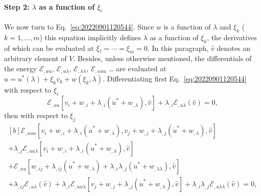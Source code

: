 \documentclass[12pt, final]{scrartcl}
\theoremstyle{definition}
\newcommand{\E}{\mathcal E}
\begin{document}
\paragraph{Step 2: $\lambda$ as a function of $ξ_i$} We now turn to
Eq.~\eqref{eq:20220901120544}. Since $w$ is a function of $\lambda$ and $ξ_k$
($k = 1, \ldots, m$) this equation implicitly defines $\lambda$ as a function of
$ξ_k$, the derivatives of which can be evaluated at $ξ₁ = \cdots = ξ_m =
0$. In this paragraph, $\hat{v}$ denotes an arbitrary element of
$V$. Besides, unless otherwise mentioned, the differentials of the energy
$\E_{,uu}$, $\E_{,u\lambda}$, $\E_{,\lambda\lambda}$, $\E_{,uuu}$ \dots{} are evaluated at
$u = u^\ast(\lambda) + ξ_k v_k + w(ξ_k, \lambda)$. Differentiating first
Eq.~\eqref{eq:20220901120544} with respect to $ξ_i$
\begin{equation}
  \label{eq:20220901121940}
  \E_{,uu}[v_i + w_{,i} + \lambda_{,i} (\dot{u}^\ast + w_{,\lambda}), \hat{v}] + \lambda_{, i} \E_{,u\lambda}(\hat{v}) = 0,
\end{equation}
then with respect to $ξ_j$
\begin{equation}
  \label{eq:20220901125230}
  \begin{gathered}[b]
    \E_{,uuu}[v_i + w_{,i} + \lambda_{,i} (\dot{u}^\ast + w_{,\lambda}), v_j + w_{,j} + \lambda_{,j} (\dot{u}^\ast + w_{,\lambda}), \hat{v}]\\
    + \lambda_{,j}\E_{,uu\lambda}[v_i + w_{,i} + \lambda_{,i} (\dot{u}^\ast + w_{,\lambda}), \hat{v}]\\
    + \E_{,uu}[w_{,ij} + \lambda_{,ij} (\dot{u}^\ast + w_{,\lambda}) + \lambda_{,i}\lambda_{,j} (\ddot{u}^\ast + w_{,\lambda\lambda}), \hat{v}]\\
    + \lambda_{, ij} \E_{,u\lambda}(\hat{v}) + \lambda_{, i} \E_{,uu\lambda}[v_j + w_{,j} + \lambda_{,j} (\dot{u}^\ast + w_{,\lambda}), \hat{v}] + \lambda_{,i} \lambda_{,j} \E_{,u\lambda\lambda}(\hat{v})= 0,
  \end{gathered}
\end{equation}
\end{document}
